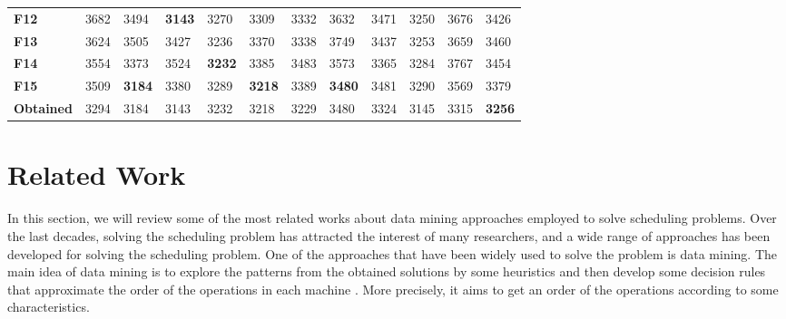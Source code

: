 \documentclass[runningheads]{llncs}
\begin{document}
\begin{table}
\begin{center}
\begin{tabular}{|l|l|l|l|l|l|l|l|l|l|l|l|}
      \textbf{F12}         & 3682                           & 3494                           & \textbf{3143} & 3270 & 3309                           & 3332                           & 3632                           & 3471 & 3250                           & 3676 & 3426 \\
      \textbf{F13}         & 3624                           & 3505                           & 3427                           & 3236 & 3370                           & 3338                           & 3749                           & 3437 & 3253                           & 3659 & 3460 \\
      \textbf{F14}         & 3554                           & 3373                           & 3524                           & \textbf{3232} & 3385                           & 3483                           & 3573                           & 3365 & 3284                           & 3767 & 3454 \\
      \textbf{F15}         & 3509                           & \textbf{3184} & 3380                           & 3289 & \textbf{3218} & 3389                           & \textbf{3480} & 3481 & 3290                           & 3569 & 3379 \\ \hline
      \textbf{Obtained} & 3294                           & 3184 & 3143                           & 3232 & 3218 & 3229                           & 3480 & 3324 & 3145                           & 3315 & \textbf{3256} \\
\hline
      \end{tabular}
  \end{center}
\end{table}



\section{Related Work}
\label{sec:literature}
In this section, we will review some of the most related works about data mining approaches employed to solve scheduling problems. Over the last decades, solving the scheduling problem has attracted the interest of many researchers, and a wide range of approaches has been developed for solving the scheduling problem. One of the approaches that have been widely used to solve the problem is data mining. The main idea of data mining is to explore the patterns from the obtained solutions by some heuristics and then develop some decision rules that approximate the order of the operations in each machine \cite{ismail2012production}. More precisely, it aims to get an order of the operations according to some characteristics.\\
\end{document}
